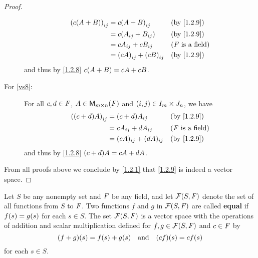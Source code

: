 \begin{proof}
\begin{description}
\begin{align*}
        \p{c \p{A + B}}_{i j} & = c \p{A + B}_{i j}           &  & \text{(by \cref{1.2.9})}   \\
                              & = c \p{A_{i j} + B_{i j}}     &  & \text{(by \cref{1.2.9})}   \\
                              & = c A_{i j} + c B_{i j}       &  & \text{(\(\F\) is a field)} \\
                              & = \p{cA}_{i j} + \p{cB}_{i j} &  & \text{(by \cref{1.2.9})}
      \end{align*}
      and thus by \cref{1.2.8} \(c \p{A + B} = cA + cB\).
    \item[For \ref{vs8}:]
      For all \(c, d \in \mathit{F}\), \(A \in {{\mathsf{M}_{{m} \times n}({\mathit{F}})}}\) and \(\left\lparen i, j\right\rparen \in I_{m} \times J_{n}\), we have
      \begin{align*}
        \p{\p{c + d} A}_{i j} & = \p{c + d} A_{i j}       &  & \text{(by \cref{1.2.9})}   \\
                              & = c A_{i j} + d A_{i j}   &  & \text{(\(\F\) is a field)} \\
                              & = (cA)_{i j} + (dA)_{i j} &  & \text{(by \cref{1.2.9})}
      \end{align*}
      and thus by \cref{1.2.8} \(\p{c + d} A = cA + dA\).
  \end{description}
  From all proofs above we conclude by \cref{1.2.1} that \cref{1.2.9} is indeed a vector space.
\end{proof}

\begin{eg}\label{1.2.10}
  Let \(S\) be any nonempty set and \(\mathit{F}\) be any field, and let \(\FS\) denote the set of all functions from \(S\) to \(\mathit{F}\).
  Two functions \(f\) and \(g\) in \(\FS\) are called \textbf{equal} if \(f\p{s} = g\p{s}\) for each \(s \in S\).
  The set \(\FS\) is a vector space with the operations of addition and scalar multiplication defined for \(f, g \in \FS\) and \(c \in \mathit{F}\) by
  \[
    \p{f + g}\p{s} = f\p{s} + g\p{s} \quad \text{and} \quad \p{cf}\p{s} = cf\p{s}
  \]
  for each \(s \in S\).
\end{eg}

